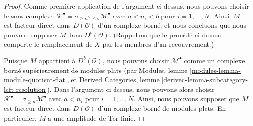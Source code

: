 \begin{proof}
\medskip\noindent
Comme première application de l'argument ci-dessus, nous pouvons choisir le
sous-complexe
$\mathcal{K}^\bullet = \sigma_{\geq a} \tau_{\leq b}\mathcal{M}^\bullet$
avec $a < n_i < b$ pour $i = 1, \ldots, N$. Ainsi, $M$ est facteur direct
dans $D(\mathcal{O})$ d'un complexe borné, et nous concluons que nous pouvons
supposer $M$ dans $D^b(\mathcal{O})$. (Rappelons que le procédé ci-dessus
comporte le remplacement de $X$ par les membres d'un recouvrement.)

\medskip\noindent
Puisque $M$ appartient à $D^b(\mathcal{O})$, nous pouvons choisir
$\mathcal{M}^\bullet$ comme un complexe borné supérieurement de modules plats
(par Modules, lemme \ref{modules-lemma-module-quotient-flat}, et Derived
Categories, lemme \ref{derived-lemma-subcategory-left-resolution}). Dans
l'argument ci-dessus, nous pouvons alors choisir
$\mathcal{K}^\bullet = \sigma_{\geq a}\mathcal{M}^\bullet$ avec $a < n_i$
pour $i = 1, \ldots, N$. Ainsi, nous pouvons supposer que $M$ est facteur
direct dans $D(\mathcal{O})$ d'un complexe borné de modules plats. En
particulier, $M$ a une amplitude de Tor finie.


\end{proof}
